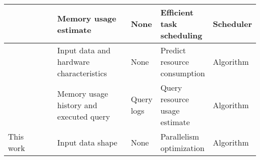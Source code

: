 \begin{table}[ht]
{\begin{tabular}{@{}|p{0.11\linewidth}|p{0.3\linewidth}|p{0.5\linewidth}|p{0.3\linewidth}|p{0.3\linewidth}|p{0.2\linewidth}|@{}}
      \cite{goponenko2020} &                                      & Memory usage estimate                                        & None                                     & Efficient task scheduling      & Scheduler            \\ \midrule
      \cite{duplyakin2018} &                                      & Input data and hardware characteristics                      & None                                     & Predict resource consumption   & Algorithm            \\ \midrule
      \cite{tang2021}      &                                      & Memory usage history and executed query                      & Query logs                               & Query resource usage estimate  & Algorithm            \\ \midrule
      This work            &                                      & Input data shape                                             & None                                     & Parallelism optimization       & Algorithm            \\ \midrule
    \end{tabular}
  }
\end{table}
